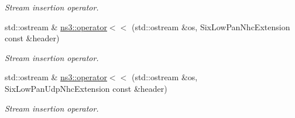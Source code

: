 \begin{DoxyCompactItemize}
\begin{DoxyCompactList}\small\item\em Stream insertion operator. \end{DoxyCompactList}\item 
std\+::ostream \& \hyperlink{namespacens3_a26ce9048762f58b5cfb3575bf1f6cb1f}{ns3\+::operator$<$$<$} (std\+::ostream \&os, Six\+Low\+Pan\+Nhc\+Extension const \&header)
\begin{DoxyCompactList}\small\item\em Stream insertion operator. \end{DoxyCompactList}\item 
std\+::ostream \& \hyperlink{namespacens3_af672868ddbf6ab2d2987858cfa1cc1bb}{ns3\+::operator$<$$<$} (std\+::ostream \&os, Six\+Low\+Pan\+Udp\+Nhc\+Extension const \&header)
\begin{DoxyCompactList}\small\item\em Stream insertion operator. \end{DoxyCompactList}\end{DoxyCompactItemize}
